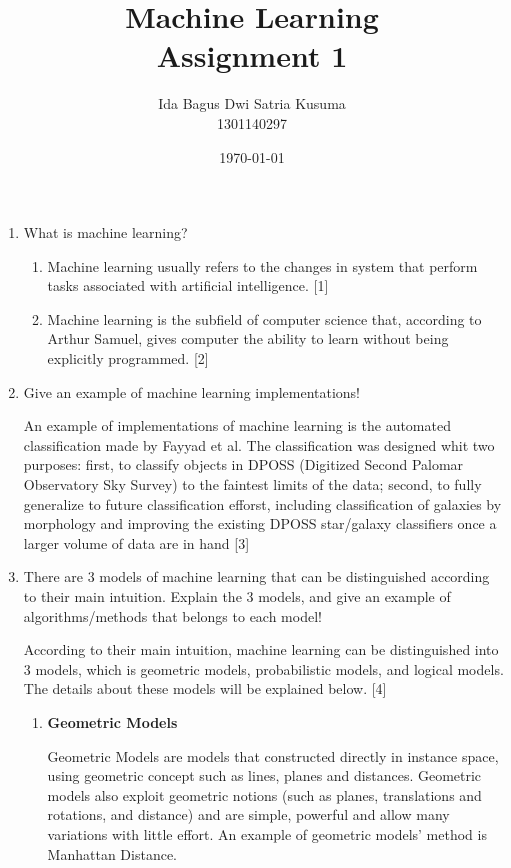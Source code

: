 \documentclass[12pt]{article}%
\begin{document}
\title{Machine Learning \protect\\ Assignment 1}
\author{Ida Bagus Dwi Satria Kusuma \protect\\ 1301140297}
\date{\today}
\maketitle

\begin{enumerate}
	\item What is machine learning? 
	\begin{enumerate}
		\item Machine learning usually refers to the changes in system that perform tasks associated with artificial intelligence. [1]
		\item Machine learning is the subfield of computer science that, according to Arthur Samuel, gives computer the ability to learn without being explicitly programmed. [2]
	\end{enumerate}

	\item Give an example of machine learning implementations!
	\par An example of implementations of machine learning is the automated classification made by Fayyad et al. The classification was designed whit two purposes: first, to classify objects in DPOSS (Digitized Second Palomar Observatory Sky Survey) to the faintest limits of the data; second, to fully generalize to future classification efforst, including classification of galaxies by morphology and improving the existing DPOSS star/galaxy classifiers once a larger volume of data are in hand [3]

	\item There are 3 models of machine learning that can be distinguished according to their main intuition. Explain the 3 models, and give an example of algorithms/methods that belongs to each model!

	\par According to their main intuition, machine learning can be distinguished into 3 models, which is geometric models, probabilistic models, and logical models. The details about these models will be explained below. [4]

	\begin{enumerate}
		\item \textbf{Geometric Models}
		\par Geometric Models are models that constructed directly in instance space, using geometric concept such as lines, planes and distances. Geometric models also exploit geometric notions (such as planes, translations and rotations, and distance) and are simple, powerful and allow many variations with little effort. An example of geometric models' method  is Manhattan Distance.


\end{enumerate}
\end{enumerate}
\end{document}
